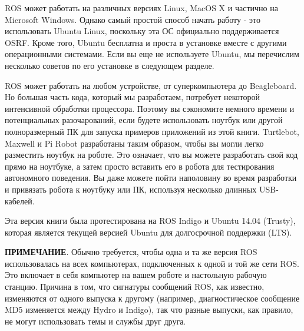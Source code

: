 

ROS может работать на различных версиях Linux, MacOS X и частично на Microsoft Windows. Однако самый простой способ начать работу - это использовать Ubuntu Linux, поскольку эта ОС официально поддерживается OSRF. Кроме того, Ubuntu бесплатна и проста в установке вместе с другими операционными системами. Если вы еще не используете Ubuntu, мы перечислим несколько советов по его установке в следующем разделе.

ROS может работать на любом устройстве, от суперкомпьютера до Beagleboard. Но большая часть кода, который мы разработаем, потребует некоторой интенсивной обработки процессора. Поэтому вы сэкономите немного времени и потенциальных разочарований, если будете использовать ноутбук или другой полноразмерный ПК для запуска примеров приложений из этой книги. Turtlebot, Maxwell и Pi Robot разработаны таким образом, чтобы вы могли легко разместить ноутбук на роботе. Это означает, что вы можете разработать свой код прямо на ноутбуке, а затем просто вставить его в робота для тестирования автономного поведения. Вы даже можете пойти наполовину во время разработки и привязать робота к ноутбуку или ПК, используя несколько длинных USB-кабелей.

Эта версия книги была протестирована на ROS Indigo и Ubuntu 14.04 (Trusty), которая является текущей версией Ubuntu для долгосрочной поддержки (LTS).

\textbf{ПРИМЕЧАНИЕ}. Обычно требуется, чтобы одна и та же версия ROS использовалась на всех компьютерах, подключенных к одной и той же сети ROS. Это включает в себя компьютер на вашем роботе и настольную рабочую станцию. Причина в том, что сигнатуры сообщений ROS, как известно, изменяются от одного выпуска к другому (например, диагностическое сообщение MD5 изменяется между Hydro и Indigo), так что разные выпуски, как правило, не могут использовать темы и службы друг друга.

